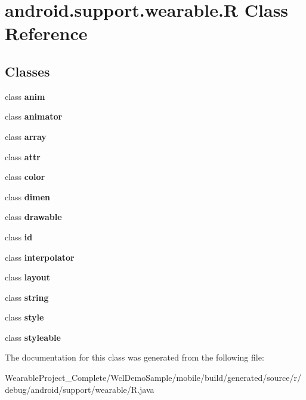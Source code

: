 \hypertarget{classandroid_1_1support_1_1wearable_1_1R}{}\section{android.\+support.\+wearable.\+R Class Reference}
\label{classandroid_1_1support_1_1wearable_1_1R}
\subsection*{Classes}
\begin{DoxyCompactItemize}
\item 
class {\bfseries anim}
\item 
class {\bfseries animator}
\item 
class {\bfseries array}
\item 
class {\bfseries attr}
\item 
class {\bfseries color}
\item 
class {\bfseries dimen}
\item 
class {\bfseries drawable}
\item 
class {\bfseries id}
\item 
class {\bfseries interpolator}
\item 
class {\bfseries layout}
\item 
class {\bfseries string}
\item 
class {\bfseries style}
\item 
class {\bfseries styleable}
\end{DoxyCompactItemize}


The documentation for this class was generated from the following file\+:\begin{DoxyCompactItemize}
\item 
Wearable\+Project\+\_\+\+Complete/\+Wcl\+Demo\+Sample/mobile/build/generated/source/r/debug/android/support/wearable/R.\+java\end{DoxyCompactItemize}

